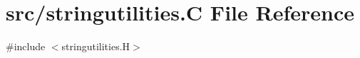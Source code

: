 \hypertarget{stringutilities_8_c}{}\section{src/stringutilities.C File Reference}
\label{stringutilities_8_c}
{\ttfamily \#include $<$stringutilities.\+H$>$}\newline
